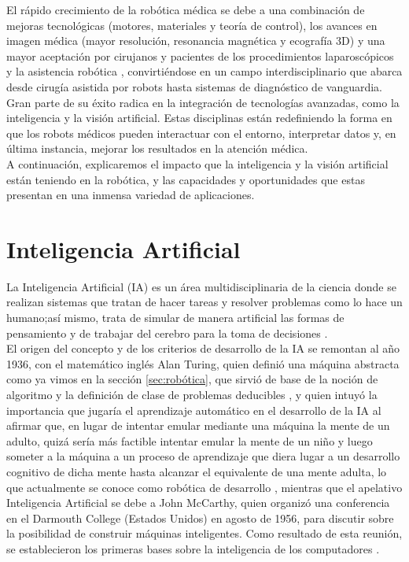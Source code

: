 El rápido crecimiento de la robótica médica se debe a una combinación de mejoras tecnológicas (motores, materiales y teoría de control), los avances en imagen médica (mayor resolución, resonancia magnética y ecografía 3D) y una mayor aceptación por cirujanos y pacientes de los procedimientos laparoscópicos y la asistencia robótica \cite{Beasley12}, convirtiéndose en un campo interdisciplinario que abarca desde cirugía asistida por robots hasta sistemas de diagnóstico de vanguardia. Gran parte de su éxito radica en la integración de tecnologías avanzadas, como la inteligencia y la visión artificial. Estas disciplinas están redefiniendo la forma en que los robots médicos pueden interactuar con el entorno, interpretar datos y, en última instancia, mejorar los resultados en la atención médica.\\

A continuación, explicaremos el impacto que la inteligencia y la visión artificial están teniendo en la robótica, y las capacidades y oportunidades que estas presentan en una inmensa variedad de aplicaciones.

\section{Inteligencia Artificial}
\label{sec:IA} 

La Inteligencia Artificial (IA) es un área multidisciplinaria de la ciencia %
donde se realizan sistemas que tratan de hacer tareas y resolver problemas como lo hace un humano;así mismo, trata de simular de manera artificial las formas de pensamiento y de trabajar del cerebro para la toma de decisiones \cite{Ponce14}.\\

El origen del concepto y de los criterios de desarrollo de la IA se remontan al año 1936, con el matemático inglés Alan Turing, quien definió una máquina abstracta como ya vimos en la sección \ref{sec:robótica}, que sirvió de base de la noción de algoritmo y la definición de clase de problemas deducibles \cite{Hardy01}, y quien intuyó la importancia que jugaría el aprendizaje automático en el desarrollo de la IA al afirmar que, en lugar de intentar emular mediante una máquina la mente de un adulto, quizá sería más factible intentar emular la mente de un niño y luego someter a la máquina a un proceso de aprendizaje que diera lugar a un desarrollo cognitivo de dicha mente hasta alcanzar el equivalente de una mente adulta, lo que actualmente se conoce como robótica de desarrollo \cite{Gonzalez17}, mientras que el apelativo Inteligencia Artificial se debe a John McCarthy, quien organizó una conferencia en el Darmouth College (Estados Unidos) en agosto de 1956, para discutir sobre la posibilidad de construir máquinas inteligentes. Como resultado de esta reunión, se establecieron los primeras bases sobre la inteligencia de los computadores \cite{Ponce14}.\\ 

